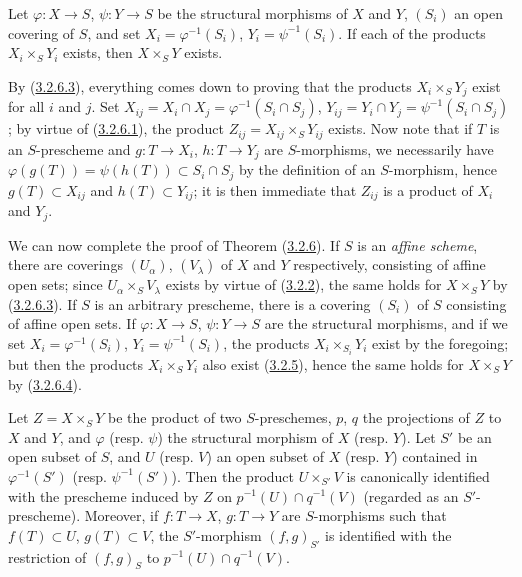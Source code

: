 \begin{lemma}[3.2.6.4]
\label{I.3.2.6.4}
Let $\varphi:X\to S$, $\psi:Y\to S$ be the structural morphisms of $X$
and $Y$, $(S_i)$ an open covering of $S$, and set
$X_i=\varphi^{-1}(S_i)$, $Y_i=\psi^{-1}(S_i)$. If each of the products
$X_i\times_S Y_i$ exists, then $X\times_S Y$ exists.
\end{lemma}

By (\hyperref[I.3.2.6.3]{3.2.6.3}), everything comes down to proving that the
products $X_i\times_S Y_j$ exist for all $i$ and $j$. Set
$X_{ij}=X_i\cap X_j=\varphi^{-1}(S_i\cap S_j)$,
$Y_{ij}=Y_i\cap Y_j=\psi^{-1}(S_i\cap S_j)$; by virtue of
(\hyperref[I.3.2.6.1]{3.2.6.1}), the product
$Z_{ij}=X_{ij}\times_S Y_{ij}$ exists. Now note that if $T$ is an
$S$-prescheme and $g:T\to X_i$, $h:T\to Y_j$ are $S$-morphisms, we
necessarily have
$\varphi(g(T))=\psi(h(T))\subset S_i\cap S_j$ by the definition of an
$S$-morphism, hence $g(T)\subset X_{ij}$ and $h(T)\subset Y_{ij}$; it is
then immediate that $Z_{ij}$ is a product of $X_i$ and $Y_j$.

\begin{env}[3.2.6.5]
\label{I.3.2.6.5}
We can now complete the proof of Theorem
(\hyperref[I.3.2.6]{3.2.6}). If $S$ is an \emph{affine scheme}, there are
coverings $(U_\alpha)$, $(V_\lambda)$ of $X$ and $Y$ respectively,
consisting of affine open sets; since $U_\alpha\times_S V_\lambda$ exists by
virtue of (\hyperref[I.3.2.2]{3.2.2}), the same holds for
$X\times_S Y$ by (\hyperref[I.3.2.6.3]{3.2.6.3}). If $S$ is an
arbitrary prescheme, there is a covering $(S_i)$ of $S$ consisting of affine
open sets. If $\varphi:X\to S$, $\psi:Y\to S$ are the structural
morphisms, and if we set $X_i=\varphi^{-1}(S_i)$,
$Y_i=\psi^{-1}(S_i)$, the products $X_i\times_{S_i}Y_i$ exist by the
foregoing; but then the products $X_i\times_S Y_i$ also exist
(\hyperref[I.3.2.5]{3.2.5}), hence the same holds for $X\times_S Y$ by
(\hyperref[I.3.2.6.4]{3.2.6.4}).
\end{env}

\begin{corollary}[3.2.7]
\label{I.3.2.7}
Let $Z=X\times_S Y$ be the product of two $S$-preschemes, $p$, $q$ the
projections of $Z$ to $X$ and $Y$, and $\varphi$ \textup{(resp. $\psi$)} the structural
morphism of $X$ \textup{(resp. $Y$)}. Let $S'$ be an open subset of $S$, and $U$
\textup{(resp. $V$)} an open subset of $X$ \textup{(resp. $Y$)} contained in
$\varphi^{-1}(S')$ \textup{(resp. $\psi^{-1}(S')$)}. Then the product
$U\times_{S'}V$ is canonically identified with the prescheme induced by $Z$ on
$p^{-1}(U)\cap q^{-1}(V)$ (regarded as an $S'$-prescheme). Moreover, if
$f:T\to X$, $g:T\to Y$ are $S$-morphisms such that $f(T)\subset U$,
$g(T)\subset V$, the $S'$-morphism $(f,g)_{S'}$ is identified with the
restriction of $(f,g)_S$ to $p^{-1}(U)\cap q^{-1}(V)$.
\end{corollary}

